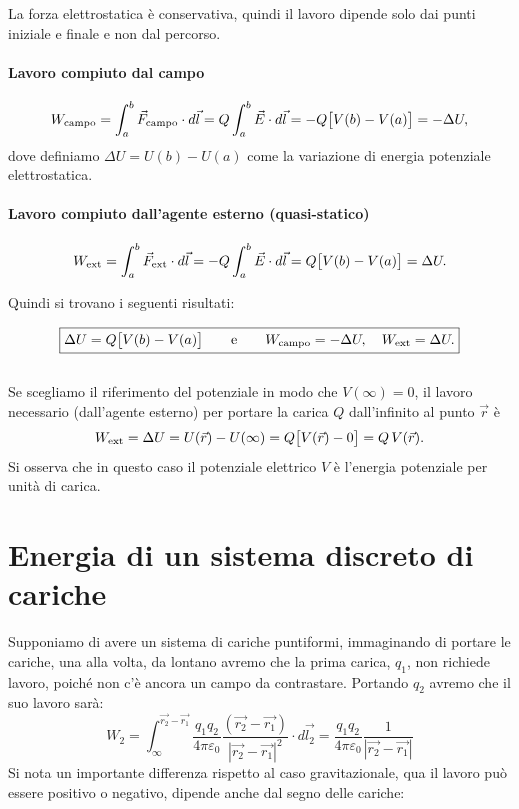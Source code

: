 \documentclass{book}
\begin{document}
La forza elettrostatica è conservativa, quindi il lavoro dipende solo dai punti iniziale e finale e non dal percorso.

\paragraph{Lavoro compiuto dal campo}
\[
W_{\rm campo}=\int_{a}^{b}\vec{F}_{\rm campo}\cdot d\vec{l}
=Q\int_{a}^{b}\vec{E}\cdot d\vec{l}
=-Q\bigl[V(b)-V(a)\bigr]
= -\Delta U,
\]
dove definiamo \(\Delta U=U(b)-U(a)\) come la variazione di energia potenziale elettrostatica.

\paragraph{Lavoro compiuto dall'agente esterno (quasi-statico)} 
\[
W_{\rm ext}=\int_{a}^{b}\vec{F}_{\rm ext}\cdot d\vec{l}
=-Q\int_{a}^{b}\vec{E}\cdot d\vec{l}
=Q\bigl[V(b)-V(a)\bigr]=\Delta U.
\]

Quindi si trovano i seguenti risultati:

\[
\boxed{\Delta U = Q\bigl[V(b)-V(a)\bigr] \qquad\text{e}\qquad
W_{\rm campo}=-\Delta U,\quad W_{\rm ext}=\Delta U.}
\]
\\
Se scegliamo il riferimento del potenziale in modo che \(V(\infty)=0\), il lavoro necessario (dall'agente esterno) per portare la carica \(Q\)
dall'infinito al punto \(\vec{r}\) è
\[
W_{\rm ext} = \Delta U = U(\vec{r})-U(\infty)=Q\bigl[V(\vec{r})-0\bigr]=Q\,V(\vec{r}).
\]
Si osserva che in questo caso il potenziale elettrico \(V\) è l'energia potenziale per unità di carica.


\section{Energia di un sistema discreto di cariche}
Supponiamo di avere un sistema di cariche puntiformi, 
immaginando di portare le cariche, una alla volta, da lontano avremo che la prima carica, $q_1$, non richiede lavoro, poiché non c'è ancora un campo da contrastare. Portando $q_2$ avremo che il suo lavoro  sarà: 
$$
W_2 = \int_{\infty}^{\vec{r_2}-\vec{r_1}} \frac{q_1q_2}{4\pi   \varepsilon_0} \frac{(\vec{r_2}-\vec{r_1})}{|\vec{r_2}-\vec{r_1}|^2} \cdot d\vec{l_2}
= \frac{q_1q_2}{4\pi   \varepsilon_0} \frac{1}{|\vec{r_2}-\vec{r_1}|}
$$
Si nota un importante differenza rispetto al caso gravitazionale, qua il lavoro può essere positivo  o negativo, dipende anche dal segno delle cariche:
\end{document}
